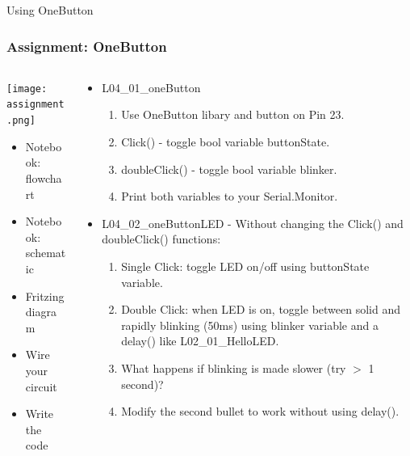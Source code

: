 \documentclass{beamer}
\begin{document}

\begin{frame}{Using OneButton}
\lstOBz
\end{frame}


\begin{frame}\frametitle{Assignment: OneButton}
\begin{columns}
\begin{column}{4.2cm}
\begin{center}
\texttt{[image: assignment.png]}
\end{center}
\begin{itemize}
\item Notebook: flowchart
\item Notebook: schematic
\item Fritzing diagram
\item Wire your circuit
\item Write the code
\end{itemize}
\end{column}
\begin{column}{8.2cm}
\begin{itemize}
\item L04\_01\_oneButton
	\begin{enumerate}
		\item Use OneButton libary and button on Pin 23.
		\item Click() - toggle bool variable buttonState.
		\item doubleClick() - toggle bool variable blinker.
		\item Print both variables to your Serial.Monitor.
	\end{enumerate}
\item L04\_02\_oneButtonLED - Without changing the Click() and doubleClick() functions:
	\begin{enumerate}
	\item Single Click: toggle LED on/off using buttonState variable.
	\item Double Click: when LED is on, toggle between solid and rapidly blinking (50ms) using blinker variable and a delay() like L02\_01\_HelloLED.
	\item What happens if blinking is made slower (try $>$ 1 second)?
	\item Modify the second bullet to work without using delay().
	\end{enumerate}
\end{itemize}
\end{column}
\end{columns}
\end{frame}
\end{document}
